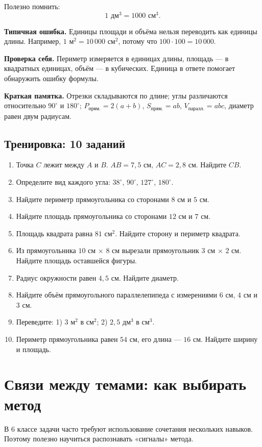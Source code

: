 \documentclass[12pt,a4paper]{article}
\newcommand{\mistake}[1]{%
  \par\smallskip
  {\color{accent}\textbf{Типичная ошибка.}} #1\par\smallskip
}
\newcommand{\selfcheck}[1]{%
  \par\smallskip
  {\color{accent}\textbf{Проверка себя.}} #1\par\smallskip
}
\newcommand{\memo}[1]{%
  \par\smallskip
  \begingroup
  \setlength{\fboxsep}{7pt}%
  \colorbox{accentlight}{\parbox{0.94\textwidth}{\textbf{Краткая памятка.} #1}}%
  \endgroup
  \par\smallskip
}
\newcommand{\trainingtitle}{\subsection*{Тренировка: 10 заданий}}
\begin{document}
Полезно помнить:
\[
1\text{ дм}^3=1000\text{ см}^3.
\]

\mistake{Единицы площади и объёма нельзя переводить как единицы длины. Например, $1\text{ м}^2=10\,000\text{ см}^2$, потому что $100\cdot100=10\,000$.}

\selfcheck{Периметр измеряется в единицах длины, площадь --- в квадратных единицах, объём --- в кубических. Единица в ответе помогает обнаружить ошибку формулы.}

\memo{Отрезки складываются по длине; углы различаются относительно $90^\circ$ и $180^\circ$; $P_{\text{прям.}}=2(a+b)$, $S_{\text{прям.}}=ab$, $V_{\text{паралл.}}=abc$, диаметр равен двум радиусам.}

\trainingtitle
\begin{enumerate}
  \item Точка $C$ лежит между $A$ и $B$. $AB=7{,}5$ см, $AC=2{,}8$ см. Найдите $CB$.
  \item Определите вид каждого угла: $38^\circ$, $90^\circ$, $127^\circ$, $180^\circ$.
  \item Найдите периметр прямоугольника со сторонами $8$ см и $5$ см.
  \item Найдите площадь прямоугольника со сторонами $12$ см и $7$ см.
  \item Площадь квадрата равна $81$ см$^2$. Найдите сторону и периметр квадрата.
  \item Из прямоугольника $10$ см $\times$ $8$ см вырезали прямоугольник $3$ см $\times$ $2$ см. Найдите площадь оставшейся фигуры.
  \item Радиус окружности равен $4{,}5$ см. Найдите диаметр.
  \item Найдите объём прямоугольного параллелепипеда с измерениями $6$ см, $4$ см и $3$ см.
  \item Переведите: 1) $3$ м$^2$ в см$^2$; 2) $2{,}5$ дм$^3$ в см$^3$.
  \item Периметр прямоугольника равен $54$ см, его длина --- $16$ см. Найдите ширину и площадь.
\end{enumerate}

\newpage

\section{Связи между темами: как выбирать метод}

В 6 классе задачи часто требуют использование сочетания нескольких навыков. Поэтому полезно научиться распознавать «сигналы» метода.
\end{document}
